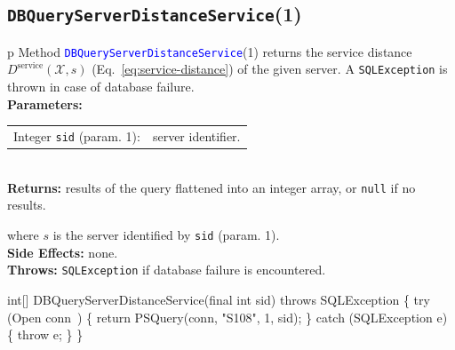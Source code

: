 \subsection{\texttt{DBQueryServerDistanceService}(1)}
\begin{tabular}{p{\textwidth}}
\toprule
{}
Method \textcolor{blue}{{\tt{}\protect{}DBQueryServerDistanceService}}(1) returns the
service distance $D^\textrm{service}(\mathcal{X},s)$
(Eq.~\ref{eq:service-distance}) of the given server.
A {\tt{}SQLException} is thrown in case of database failure.\\
\midrule
\textbf{Parameters:}\\
\begin{tabular}{lp{116mm}}
Integer {\tt{}sid} (param. 1):&server identifier.
\end{tabular}\\
\textbf{Returns:} results of the query flattened into an integer array,
or {\tt{}null} if no results.


where $s$ is the server identified by {\tt{}sid} (param. 1).\\
\textbf{Side Effects:} none.\\
\textbf{Throws:} {\tt{}SQLException} if database failure is encountered.\\
\bottomrule
\end{tabular}
\nwenddocs{}\endmoddef{}
int[] DBQueryServerDistanceService(final int sid) throws SQLException \{
  try (\LA{}Open \code{}conn\edoc{}~{\nwtagstyle{}}\RA{}) \{
    return PSQuery(conn, "S108", 1, sid);
  \} catch (SQLException e) \{
    throw e;
  \}
\}
\eatline
{}\nwendcode{}\nwdocspar
